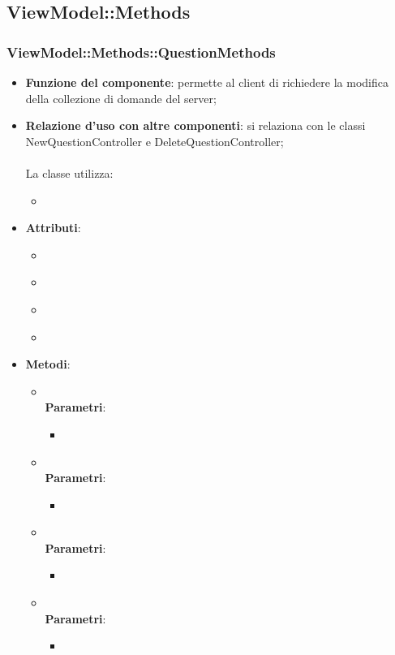 \subsection{ViewModel::Methods}
\subsubsection{ViewModel::Methods::QuestionMethods}
\begin{itemize}
\item\textbf{Funzione del componente}: permette al client di richiedere la modifica della collezione di domande del server;
	\item\textbf{Relazione d'uso con altre componenti}: si relaziona con le classi NewQuestionController e DeleteQuestionController;\\ \\
La classe utilizza:
	\begin{itemize}
		\item
	\end{itemize}
\item\textbf{Attributi}:
	\begin{itemize}
		\item\code{}\\
		\item\code{}\\
		\item\code{}\\
		\item\code{}\\
	\end{itemize}
\item\textbf{Metodi}:
	\begin{itemize}
		\item\code{}\\
		\textbf{Parametri}:
			\begin{itemize}
				\item\code{}\\
			\end{itemize}
		\item\code{}\\
		\textbf{Parametri}:
			\begin{itemize}
				\item\code{}\\
			\end{itemize}
		\item\code{}\\
		\textbf{Parametri}:
			\begin{itemize}
				\item\code{}\\
			\end{itemize}
		\item\code{}\\
		\textbf{Parametri}:
			\begin{itemize}
				\item\code{}\\
			\end{itemize}
	\end{itemize}
\end{itemize}


